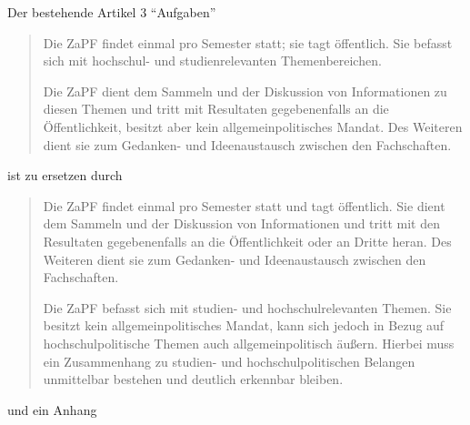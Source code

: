 \documentclass[draft,10pt,oneside]{scrartcl}
\begin{document}
Der bestehende Artikel 3 ``Aufgaben''
\begin{quote}
Die ZaPF findet einmal pro Semester statt; sie tagt öffentlich. Sie befasst
sich mit hochschul- und studienrelevanten Themenbereichen.

Die ZaPF dient dem Sammeln und der Diskussion von Informationen zu diesen Themen
und tritt mit Resultaten gegebenenfalls an die Öffentlichkeit, besitzt aber kein
allgemeinpolitisches Mandat.
Des Weiteren dient sie zum Gedanken- und Ideenaustausch zwischen den Fachschaften.
\end{quote}
ist zu ersetzen durch
\begin{quote}
Die ZaPF findet einmal pro Semester statt und tagt öffentlich. Sie dient dem
Sammeln und der Diskussion von Informationen und tritt mit den Resultaten
gegebenenfalls an die Öffentlichkeit oder an Dritte heran.
Des Weiteren dient sie zum Gedanken- und Ideenaustausch zwischen den
Fachschaften.

Die ZaPF befasst sich mit studien- und hochschulrelevanten Themen. Sie besitzt
kein allgemeinpolitisches Mandat, kann sich jedoch in Bezug auf
hochschulpolitische Themen auch allgemeinpolitisch äußern. Hierbei muss ein
Zusammenhang zu studien- und hochschulpolitischen Belangen unmittelbar bestehen
und deutlich erkennbar bleiben.
\end{quote}
und ein Anhang
\end{document}
